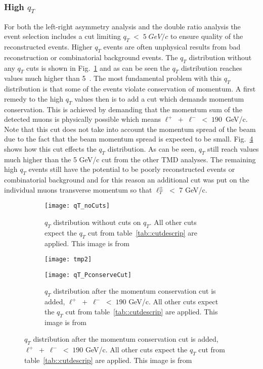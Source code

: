\subsubsection{High $q_T$} \label{sec::high_qt}
For both the left-right asymmetry analysis and the double ratio analysis the
event selection includes a cut limiting $q_T\; < \;5\; GeV/c$ to ensure quality
of the reconstructed events.  Higher $q_T$ events are often unphysical results
from bad reconstruction or combinatorial background events.  The $q_T$
distribution without any $q_T$ cuts is shown in Fig.~\ref{fig::qT_noCuts} and as
can be seen the $q_T$ distribution reaches values much higher than 5~{\gvc}.
The most fundamental problem with this $q_T$ distribution is that some of the
events violate conservation of momentum.  A first remedy to the high $q_T$
values then is to add a cut which demands momentum conservation.  This is
achieved by demanding that the momentum sum of the detected muons is physically
possible which means $\ell^+ \; + \; \ell^- \; < \; 190$~GeV/c.  Note that this
cut does not take into account the momentum spread of the beam due to the fact
that the beam momentum spread is expected to be small.
Fig.~\ref{fig::qT_PconserveCut} shows how this cut effects the $q_T$
distribution.  As can be seen, $q_T$ still reach values much higher than the 5
GeV/c cut from the other TMD analyses.  The remaining high $q_T$ events still
have the potential to be poorly reconstructed events or combinatorial background
and for this reason an additional cut was put on the individual muons transverse
momentum so that $\ell_T^{\pm} \; <$ 7 GeV/c.

\begin{figure}[h!t]
  \centering
  \begin{subfigure}{.46\textwidth}
    \centering \texttt{[image: qT\_noCuts]}
    \caption{$q_T$ distribution without cuts on $q_T$.  All other cuts expect
      the $q_T$ cut from table~\ref{tab::cutdescrip} are applied.  This image is
      from~\cite{janthesis}}
    \label{fig::qT_noCuts}
  \end{subfigure}%
  \begin{subfigure}{.02\textwidth}
    \centering
    \texttt{[image: tmp2]}
    \label{fig::tmp2}%
  \end{subfigure}
  \begin{subfigure}{.46\textwidth}
    \centering \texttt{[image: qT\_PconserveCut]}
    \caption{$q_T$ distribution after the momentum conservation cut is added,
      $\ell^+ \; + \; \ell^- \; < \; 190$ GeV/c.  All other cuts expect the
      $q_T$ cut from table~\ref{tab::cutdescrip} are applied.  This image is
      from~\cite{janthesis}}
    \label{fig::qT_PconserveCut}
  \end{subfigure}
\end{figure}

